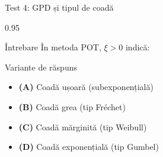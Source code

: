 \documentclass[9pt, aspectratio=169, t]{beamer}
\begin{document}
\begin{frame}{Test 4: GPD și tipul de coadă}
    \begin{cminipage}{0.95\textwidth}
    \begin{alertblock}{Întrebare}
        În metoda POT, $\xi > 0$ indică:
    \end{alertblock}
    \begin{block}{Variante de răspuns}
    \begin{itemize}\setlength{\itemsep}{0pt}
        \item \textcolor{MainBlue}{\textbf{(A)}} Coadă ușoară (subexponențială)
        \item \textcolor{MainBlue}{\textbf{(B)}} Coadă grea (tip Fr\'{e}chet)
        \item \textcolor{MainBlue}{\textbf{(C)}} Coadă mărginită (tip Weibull)
        \item \textcolor{MainBlue}{\textbf{(D)}} Coadă exponențială (tip Gumbel)
    \end{itemize}
    \end{block}
    \end{cminipage}
\end{frame}
\end{document}
